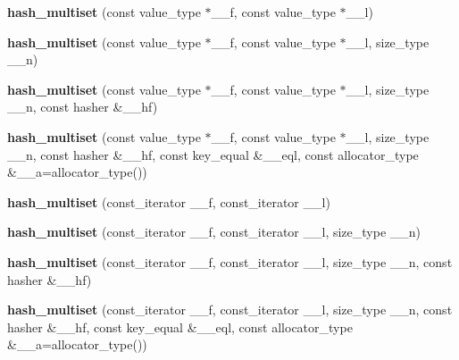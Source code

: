 \begin{DoxyCompactItemize}
{\bfseries hash\+\_\+multiset} (const value\+\_\+type $\ast$\+\_\+\+\_\+f, const value\+\_\+type $\ast$\+\_\+\+\_\+l)
\item 
\mbox{\label{classhash__multiset_aaef63c457e3eaa1c195d4939b78df7bb}} 
{\bfseries hash\+\_\+multiset} (const value\+\_\+type $\ast$\+\_\+\+\_\+f, const value\+\_\+type $\ast$\+\_\+\+\_\+l, size\+\_\+type \+\_\+\+\_\+n)
\item 
\mbox{\label{classhash__multiset_a11bfa2da36ae33baa692b85d3804c191}} 
{\bfseries hash\+\_\+multiset} (const value\+\_\+type $\ast$\+\_\+\+\_\+f, const value\+\_\+type $\ast$\+\_\+\+\_\+l, size\+\_\+type \+\_\+\+\_\+n, const hasher \&\+\_\+\+\_\+hf)
\item 
\mbox{\label{classhash__multiset_a594ecce793425d43a2c8b964f2a75741}} 
{\bfseries hash\+\_\+multiset} (const value\+\_\+type $\ast$\+\_\+\+\_\+f, const value\+\_\+type $\ast$\+\_\+\+\_\+l, size\+\_\+type \+\_\+\+\_\+n, const hasher \&\+\_\+\+\_\+hf, const key\+\_\+equal \&\+\_\+\+\_\+eql, const allocator\+\_\+type \&\+\_\+\+\_\+a=allocator\+\_\+type())
\item 
\mbox{\label{classhash__multiset_a5b418cbeee01a9c319967d75520191dc}} 
{\bfseries hash\+\_\+multiset} (const\+\_\+iterator \+\_\+\+\_\+f, const\+\_\+iterator \+\_\+\+\_\+l)
\item 
\mbox{\label{classhash__multiset_ad1dc9963e4775eaed76ce93c19f016b9}} 
{\bfseries hash\+\_\+multiset} (const\+\_\+iterator \+\_\+\+\_\+f, const\+\_\+iterator \+\_\+\+\_\+l, size\+\_\+type \+\_\+\+\_\+n)
\item 
\mbox{\label{classhash__multiset_a6028c4a188f537fed6295f65b3f4c77b}} 
{\bfseries hash\+\_\+multiset} (const\+\_\+iterator \+\_\+\+\_\+f, const\+\_\+iterator \+\_\+\+\_\+l, size\+\_\+type \+\_\+\+\_\+n, const hasher \&\+\_\+\+\_\+hf)
\item 
\mbox{\label{classhash__multiset_af54c9bdc41bff4a53c9b8f7e7e8972d7}} 
{\bfseries hash\+\_\+multiset} (const\+\_\+iterator \+\_\+\+\_\+f, const\+\_\+iterator \+\_\+\+\_\+l, size\+\_\+type \+\_\+\+\_\+n, const hasher \&\+\_\+\+\_\+hf, const key\+\_\+equal \&\+\_\+\+\_\+eql, const allocator\+\_\+type \&\+\_\+\+\_\+a=allocator\+\_\+type())

\end{DoxyCompactItemize}
